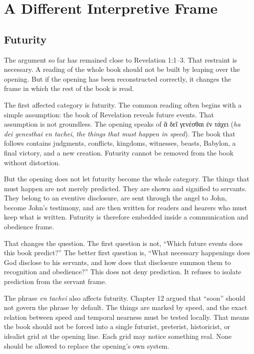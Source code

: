\chapter{A Different Interpretive Frame}

\section{Futurity}

The argument so far has remained close to Revelation 1:1--3. That restraint is necessary. A reading of the whole book should not be built by leaping over the opening. But if the opening has been reconstructed correctly, it changes the frame in which the rest of the book is read.

The first affected category is futurity. The common reading often begins with a simple assumption: the book of Revelation reveals future events. That assumption is not groundless. The opening speaks of \textgreek{ἃ δεῖ γενέσθαι ἐν τάχει} (\textit{ha dei genesthai en tachei}, \textit{the things that must happen in speed}). The book that follows contains judgments, conflicts, kingdoms, witnesses, beasts, Babylon, a final victory, and a new creation. Futurity cannot be removed from the book without distortion.

But the opening does not let futurity become the whole category. The things that must happen are not merely predicted. They are shown and signified to servants. They belong to an eventive disclosure, are sent through the angel to John, become John's testimony, and are then written for readers and hearers who must keep what is written. Futurity is therefore embedded inside a communication and obedience frame.

That changes the question. The first question is not, ``Which future events does this book predict?'' The better first question is, ``What necessary happenings does God disclose to his servants, and how does that disclosure summon them to recognition and obedience?'' This does not deny prediction. It refuses to isolate prediction from the servant frame.

The phrase \textit{en tachei} also affects futurity. Chapter 12 argued that ``soon'' should not govern the phrase by default. The things are marked by speed, and the exact relation between speed and temporal nearness must be tested locally. That means the book should not be forced into a single futurist, preterist, historicist, or idealist grid at the opening line. Each grid may notice something real. None should be allowed to replace the opening's own system.

